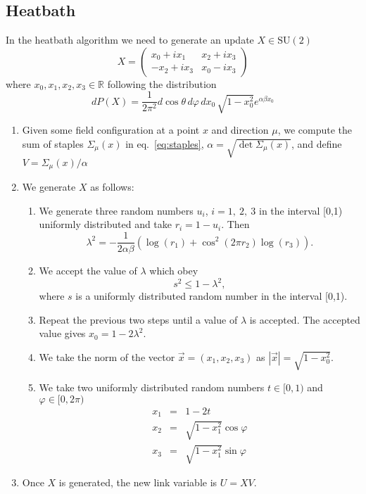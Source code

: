 \documentclass[12pt,a4paper]{article}
\begin{document}
\subsection{Heatbath}\label{sec:heatbath}
In the heatbath algorithm we need to generate an update $X\in\text{SU}(2)$
	 \begin{equation}
	 	X = \begin{pmatrix}
	 		 x_0 + ix_1 & x_2 + ix_3 \\
	 		-x_2 + ix_3 & x_0 - ix_3
	 	\end{pmatrix}
	 \end{equation}
	 where $x_0, x_1, x_2,x_3 \in \mathbb{R}$
 following the distribution
\begin{equation}
	dP(X) = \frac{1}{2\pi^2} d\cos\theta\, d\varphi\, dx_0\, \sqrt{1-x_0^2}e^{\alpha\beta x_0}
\end{equation}
\begin{enumerate}
\item Given some field configuration at a point $x$ and direction $\mu$, we compute the sum of staples $\Sigma_{\mu}(x)$ in eq.\ \eqref{eq:staples}, $\alpha = \sqrt{\det \Sigma_{\mu}(x)}$, and define $V = \Sigma_{\mu}(x)/\alpha$
	\item We generate $X$ as follows:
	\begin{enumerate}
	\item	We generate three random numbers $u_i$, $i = 1,\ 2,\ 3$ in the interval [0,1) uniformly distributed and take $r_i = 1 - u_i$. Then
		 \begin{equation}
		 	\lambda^2 = -\frac{1}{2\alpha\beta}\left(\log(r_1) + \cos^2(2\pi r_2)\log(r_3)\right).
		 \end{equation}
	\item We accept the value of $\lambda$ which obey
		\begin{equation}
			s^2 \leq 1- \lambda^2,
		\end{equation}
		where $s$ is a uniformly distributed random number in the interval [0,1).
	\item Repeat the previous two steps until a value of $\lambda$ is accepted. The accepted value gives $x_0 = 1 - 2\lambda^2$.
	\item We take the norm of the vector $\vec{x} = (x_1,x_2,x_3)$ as $|\vec{x}| = \sqrt{1 - x_0^2}$.
	\item We take two uniformly distributed random numbers $t \in [0,1)$ and $\varphi\in [0,2\pi)$ 
	\begin{eqnarray}
		x_1 & = & 1 - 2 t \\
		x_2 & = & \sqrt{1 - x_1^2} \cos\varphi \\
		x_3 & = & \sqrt{1 - x_1^2} \sin\varphi	
	\end{eqnarray}		
	  
	\end{enumerate}
	\item Once $X$ is generated, the new link variable is $U = X V$.
\end{enumerate}
\end{document}
